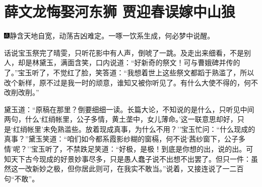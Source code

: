 \chapter{薛文龙悔娶河东狮 贾迎春误嫁中山狼}

{\includegraphics[width=3mm]{../Images/00005}\kaishu 静含天地自宽，动荡吉凶难定。一啄一饮系生成，何必梦中说醒。}

话说宝玉祭完了晴雯，只听花影中有人声，倒唬了一跳。及走出来细看，不是别人，却是林黛玉，满面含笑，口内说道：``好新奇的祭文！可与曹娥碑并传的了。''宝玉听了，不觉红了脸，笑答道：``我想着世上这些祭文都蹈于熟滥了，所以改个新样，原不过是我一时的顽意，谁知又被你听见了。有什么大使不得的，何不改削改削。''

黛玉道：``原稿在那里？倒要细细一读。长篇大论，不知说的是什么，只听见中间两句，什么`红绡帐里，公子多情，黄土垄中，女儿薄命。'这一联意思却好，只是`红绡帐里'未免熟滥些。放着现成真事，为什么不用？''宝玉忙问：``什么现成的真事？''黛玉笑道：``咱们如今都系霞影纱糊的窗槅，何不说`茜纱窗下，公子多情'呢？''宝玉听了，不禁跌足笑道：``好极，是极！到底是你想的出，说的出。可知天下古今现成的好景妙事尽多，只是愚人蠢子说不出想不出罢了。但只一件：虽然这一改新妙之极，但你居此则可，在我实不敢当。''说着，又接连说了一二百句``不敢''。

